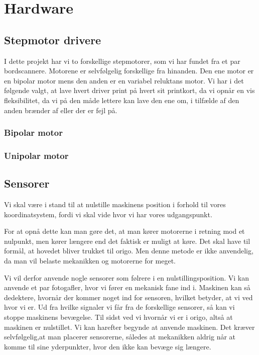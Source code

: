 \chapter[Design af hardware]{Hardware}


\section{Stepmotor drivere}
I dette projekt har vi to forskellige stepmotorer, som vi har fundet
fra et par bordscannere. Motorene er selvfølgelig forskellige fra
hinanden. Den ene motor er en bipolar motor mens den anden er en
variabel reluktans motor. Vi har i det følgende valgt, at lave hvert
driver print på hvert sit printkort, da vi opnår en vis fleksibilitet,
da vi på den måde lettere kan lave den ene om, i tilfælde af den anden
brænder af eller der er fejl på. 

\subsection{Bipolar motor}

\subsection{Unipolar motor}

\section{Sensorer}
Vi skal være i stand til at nulstille maskinens position i forhold til
vores koordinatsystem, fordi vi skal vide hvor vi har vores
udgangspunkt.

For at opnå dette kan man gøre det, at man kører motorerne i retning
mod et nulpunkt, men kører længere end det faktisk er muligt at
køre. Det skal have til formål, at hovedet bliver trukket til
origo. Men denne metode er ikke anvendelig, da man vil belaste
mekanikken og motorerne for meget.

Vi vil derfor anvende nogle sensorer som følrere i en
nulstillingsposition. Vi kan anvende et par fotogafler, hvor vi fører
en mekanisk fane ind i. Maskinen kan så dedektere, hvornår der kommer
noget ind for sensoren, hvilket betyder, at vi ved hvor vi er. Ud fra
hvilke signaler vi får fra de forskellige sensorer, så kan vi stoppe
maskinens bevægelse. Til sidst ved vi hvornår vi er i origo, altså at
maskinen er nulstillet. Vi kan harefter begynde at anvende
maskinen. Det kræver selvfølgelig,at man placerer sensorerne, således
at mekanikken aldrig når at komme til sine yderpunkter, hvor den ikke
kan bevæge sig længere.

